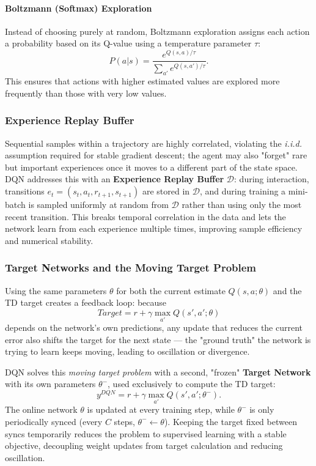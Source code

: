 \paragraph{Boltzmann (Softmax) Exploration}
Instead of choosing purely at random, Boltzmann exploration assigns each action a probability based on its Q-value using a temperature parameter $\tau$:
\begin{equation}
    P(a|s) = \frac{e^{Q(s, a)/\tau}}{\sum_{a'} e^{Q(s, a')/\tau}}.
\end{equation}
This ensures that actions with higher estimated values are explored more frequently than those with very low values.

\subsubsection{Experience Replay Buffer}
Sequential samples within a trajectory are highly correlated, violating the \textit{i.i.d.} assumption required for stable gradient descent; the agent may also "forget" rare but important experiences once it moves to a different part of the state space. DQN addresses this with an \textbf{Experience Replay Buffer} $\mathcal{D}$: during interaction, transitions $e_t = (s_t, a_t, r_{t+1}, s_{t+1})$ are stored in $\mathcal{D}$, and during training a mini-batch is sampled uniformly at random from $\mathcal{D}$ rather than using only the most recent transition. This breaks temporal correlation in the data and lets the network learn from each experience multiple times, improving sample efficiency and numerical stability.

\subsubsection{Target Networks and the Moving Target Problem}
Using the same parameters $\theta$ for both the current estimate $Q(s, a; \theta)$ and the TD target creates a feedback loop: because
\begin{equation}
    Target = r + \gamma \max_{a'} Q(s', a'; \theta)
\end{equation}
depends on the network's own predictions, any update that reduces the current error also shifts the target for the next state — the "ground truth" the network is trying to learn keeps moving, leading to oscillation or divergence.

DQN solves this \textit{moving target problem} with a second, "frozen" \textbf{Target Network} with its own parameters $\theta^-$, used exclusively to compute the TD target:
\begin{equation}
    y^{DQN} = r + \gamma \max_{a'} Q(s', a'; \theta^-).
\end{equation}
The online network $\theta$ is updated at every training step, while $\theta^-$ is only periodically synced (every $C$ steps, $\theta^- \leftarrow \theta$). Keeping the target fixed between syncs temporarily reduces the problem to supervised learning with a stable objective, decoupling weight updates from target calculation and reducing oscillation.

